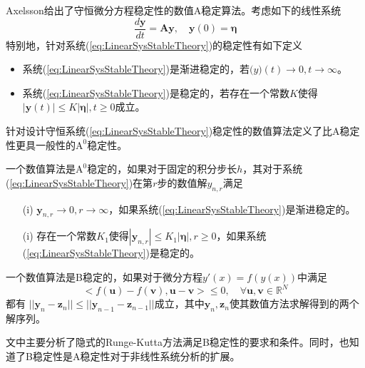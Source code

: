 Axelsson给出了守恒微分方程稳定性的数值A稳定算法\cite{Axelsson1969}。考虑如下的线性系统
\begin{equation}
\frac{d\bm{y}}{dt}=\bm{Ay},\quad \bm{y}(0)=\bm{\eta}\label{eq:LinearSysStableTheory}
\end{equation}
特别地，针对系统(\ref{eq:LinearSysStableTheory})的稳定性有如下定义
\begin{itemize}
\item 系统(\ref{eq:LinearSysStableTheory})是渐进稳定的，若$\bm(y)(t)\to0,t\to\infty$。
\item 系统(\ref{eq:LinearSysStableTheory})是稳定的，若存在一个常数$K$使得$|\bm{y}(t)|\le K|\bm{\eta}|,t\ge0$成立。
\end{itemize}
针对设计守恒系统(\ref{eq:LinearSysStableTheory})稳定性的数值算法定义了比A稳定性更具一般性的$\text{A}^0$稳定性。
\begin{definition}
一个数值算法是$\text{A}^0$稳定的\cite{Axelsson1969}，如果对于固定的积分步长$h$，其对于系统(\ref{eq:LinearSysStableTheory})在第$r$步的数值解$y_{n,r}$满足
\begin{itemize}
\item[(i)] $\bm{y}_{n,r}\to0,r\to\infty$，如果系统(\ref{eq:LinearSysStableTheory})是渐进稳定的。
\item[(i)] 存在一个常数$K_1$使得$|\bm{y}_{n,r}|\le K_1|\bm{\eta}|,r\ge0$，如果系统(\ref{eq:LinearSysStableTheory})是稳定的。
\end{itemize}
\end{definition}

\begin{definition}[B稳定性]
一个数值算法是B稳定的\cite{Butcher1975}，如果对于微分方程$y'(x)=f(y(x))$中满足
\begin{equation}
<f(\bm{u})-f(\bm{v}),\bm{u}-\bm{v}>\le0,\quad\forall\bm{u},\bm{v}\in\mathbb{R}^N
\end{equation}都有
$||\bm{y}_n-\bm{z}_n||\le ||\bm{y}_{n-1}-\bm{z}_{n-1}||$成立，其中$\bm{y}_n,\bm{z}_n$使其数值方法求解得到的两个解序列。
\end{definition}
文中主要分析了隐式的Runge-Kutta方法满足B稳定性的要求和条件。同时，也知道了B稳定性是A稳定性对于非线性系统分析的扩展。























